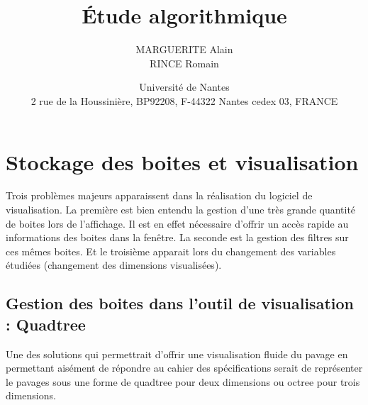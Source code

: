 \documentclass[11pt,a4paper,utf8x]{report}
\title{\'Etude algorithmique}
\author{MARGUERITE Alain\\ RINCE Romain}
\date{Université de Nantes \\ 2 rue de la Houssinière, BP92208, F-44322 Nantes cedex 03, FRANCE}
\begin{document}
\maketitle

\section{Stockage des boites et visualisation}
Trois problèmes majeurs apparaissent dans la réalisation du logiciel de visualisation. La première est bien entendu la gestion d'une très grande quantité de boites lors de l'affichage. Il est en effet nécessaire d'offrir un accès rapide au informations des boites dans la fenêtre. La seconde est la gestion des filtres sur ces mêmes boites. Et le troisième apparait lors du changement des variables étudiées (changement des dimensions visualisées).

\subsection{Gestion des boites dans l'outil de visualisation : Quadtree}
Une des solutions qui permettrait d'offrir une visualisation fluide du pavage en permettant aisément de répondre au cahier des spécifications serait de représenter le pavages sous une forme de quadtree pour deux dimensions ou octree pour trois dimensions.
\end{document}
